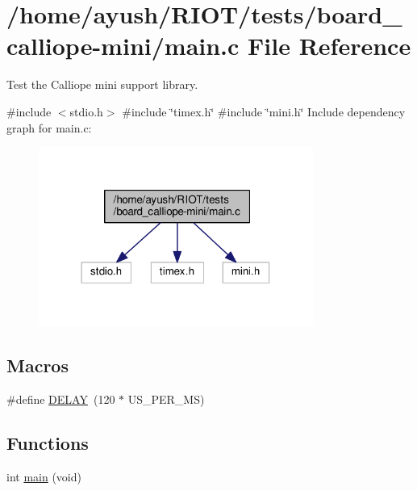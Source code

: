 \hypertarget{board__calliope-mini_2main_8c}{}\section{/home/ayush/\+R\+I\+O\+T/tests/board\+\_\+calliope-\/mini/main.c File Reference}
\label{board__calliope-mini_2main_8c}


Test the Calliope mini support library.  


{\ttfamily \#include $<$stdio.\+h$>$}\newline
{\ttfamily \#include \char`\"{}timex.\+h\char`\"{}}\newline
{\ttfamily \#include \char`\"{}mini.\+h\char`\"{}}\newline
Include dependency graph for main.\+c\+:
\nopagebreak
\begin{figure}[H]
\begin{center}
\leavevmode
\includegraphics[width=255pt]{board__calliope-mini_2main_8c__incl}
\end{center}
\end{figure}
\subsection*{Macros}
\begin{DoxyCompactItemize}
\item 
\#define \hyperlink{board__calliope-mini_2main_8c_a62249e384b997229a3e2ae74ade334e2}{D\+E\+L\+AY}~(120 $\ast$ U\+S\+\_\+\+P\+E\+R\+\_\+\+MS)
\end{DoxyCompactItemize}
\subsection*{Functions}
\begin{DoxyCompactItemize}
\item 
int \hyperlink{board__calliope-mini_2main_8c_a840291bc02cba5474a4cb46a9b9566fe}{main} (void)
\end{DoxyCompactItemize}


